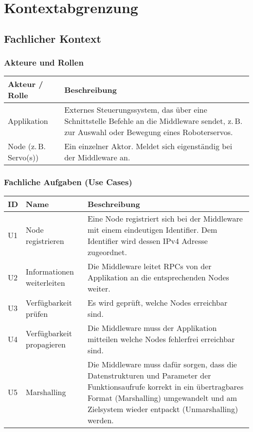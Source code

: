 \chapter{Kontextabgrenzung}


\section{Fachlicher Kontext}


\subsection{Akteure und Rollen}

\begin{tabular}{|p{4cm}|p{10cm}|}
	\hline
	\textbf{Akteur / Rolle} & \textbf{Beschreibung} \\
	\hline
	Applikation & Externes Steuerungssystem, das über eine Schnittstelle Befehle an die Middleware sendet, z.\,B. zur Auswahl oder Bewegung eines Roboterservos. \\
	\hline
	Node (z.\,B. Servo(s)) & Ein einzelner Aktor. Meldet sich eigenständig bei der Middleware an. \\
	\hline
\end{tabular}

\subsection{Fachliche Aufgaben (Use Cases)}

\begin{tabular}{|p{1.5cm}|p{4cm}|p{8.5cm}|}
	\hline
	\textbf{ID} & \textbf{Name} & \textbf{Beschreibung} \\
	\hline
	U1 & Node registrieren & Eine Node registriert sich bei der Middleware mit einem eindeutigen Identifier. Dem Identifier wird dessen IPv4 Adresse zugeordnet. \\
	\hline
	U2 & Informationen weiterleiten & Die Middleware leitet RPCs von der Applikation an die entsprechenden Nodes weiter. \\
	\hline
	U3 & Verfügbarkeit prüfen & Es wird geprüft, welche Nodes erreichbar sind. \\
	\hline
	U4 & Verfügbarkeit propagieren & Die Middleware muss der Applikation mitteilen welche Nodes fehlerfrei erreichbar sind.\\
	\hline
	U5 & Marshalling & Die Middleware muss dafür sorgen, dass die Datenstrukturen und Parameter der Funktionsaufrufe korrekt in ein übertragbares Format (Marshalling) umgewandelt und am Zielsystem wieder entpackt (Unmarshalling) werden. \\
	\hline
\end{tabular}

